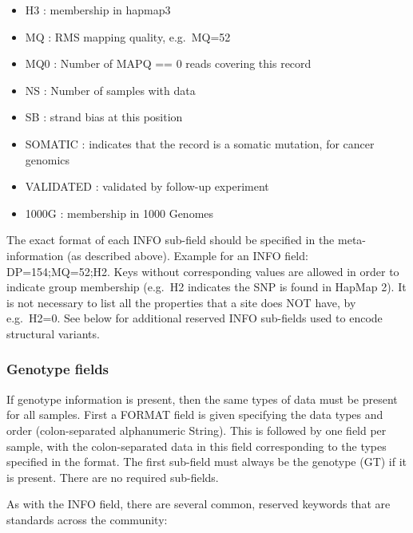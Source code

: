 \documentclass[8pt]{article}
\begin{document}
\begin{enumerate}
\begin{itemize}
  \item H3 : membership in hapmap3
  \item MQ : RMS mapping quality, e.g.\ MQ=52
  \item MQ0 : Number of MAPQ == 0 reads covering this record
  \item NS : Number of samples with data
  \item SB : strand bias at this position
  \item SOMATIC : indicates that the record is a somatic mutation, for cancer genomics
  \item VALIDATED : validated by follow-up experiment
  \item 1000G : membership in 1000 Genomes
\end{itemize}
\end{enumerate}
The exact format of each INFO sub-field should be specified in the meta-information (as described above).
Example for an INFO field: DP=154;MQ=52;H2. Keys without corresponding values are allowed in order to indicate group membership (e.g.\ H2 indicates the SNP is found in HapMap 2). It is not necessary to list all the properties that a site does NOT have, by e.g.\ H2=0. See below for additional reserved INFO sub-fields used to encode structural variants.
\subsubsection{Genotype fields}
If genotype information is present, then the same types of data must be present for all samples. First a FORMAT field is given specifying the data types and order (colon-separated alphanumeric String). This is followed by one field per sample, with the colon-separated data in this field corresponding to the types specified in the format. The first sub-field must always be the genotype (GT) if it is present.  There are no required sub-fields.

As with the INFO field, there are several common, reserved keywords that are standards across the community:
\end{document}
